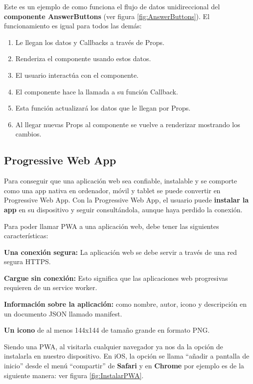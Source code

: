\documentclass[12pt,twoside,titlepage]{report}
\begin{document}
Este es un ejemplo de como funciona el flujo de datos unidireccional del \textbf{componente AnswerButtons} (ver figura \ref{fig:AnswerButtons}). El funcionamiento es igual para todos las demás: 

\begin{enumerate}
    \item Le llegan los datos y Callbacks a través de Props.
    \item Renderiza el componente usando estos datos.
    \item El usuario interactúa con el componente.
    \item El componente hace la llamada a su función Callback.
    \item Esta función actualizará los datos que le llegan por Props.
    \item Al llegar nuevas Props al componente se vuelve a renderizar mostrando los cambios.
\end{enumerate}


\subsection{Progressive Web App}
Para conseguir que una aplicación web sea confiable, instalable y se comporte como una app nativa en ordenador, móvil y tablet se puede convertir en Progressive Web App. Con la Progressive Web App, el usuario puede \textbf{instalar la app} en su dispositivo y seguir consultándola, aunque haya perdido la conexión.

Para poder llamar PWA a una aplicación web, debe tener las siguientes características:

\begin{compactitem}

    \item \textbf{Una conexión segura:} La aplicación web se debe servir a través de una red segura HTTPS.
    \item \textbf{Cargue sin conexión:} Esto significa que las aplicaciones web progresivas requieren de un service worker.
    \item \textbf{Información sobre la aplicación:} como nombre, autor, icono y descripción en un documento JSON llamado manifest.
    \item \textbf{Un icono} de al menos 144x144 de tamaño grande en formato PNG.
\end{compactitem}

Siendo una PWA, al visitarla cualquier navegador ya nos da la opción de instalarla en nuestro dispositivo. En iOS, la opción se llama ``añadir a pantalla de inicio'' desde el menú ``compartir'' de \textbf{Safari} y en \textbf{Chrome} por ejemplo es de la siguiente manera: ver figura \ref{fig:InstalarPWA}.
\end{document}

